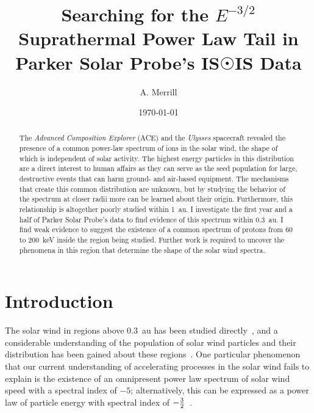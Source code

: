 \documentclass[letterpaper,11pt]{article}
\begin{document}
\title{Searching for the $E^{-3/2}$ Suprathermal Power Law Tail in Parker Solar Probe's IS$\Sun$IS Data}
\author{A. Merrill}
\date{\today}
\maketitle


\begin{abstract}
The  \textit{Advanced  Composition  Explorer} (ACE)  and  the  \textit{Ulysses}  spacecraft revealed the presence of a common power-law spectrum of ions in the solar wind, the shape of which is independent of solar activity.  The highest energy particles in this distribution are a direct interest to human affairs as they can serve as the seed population for large, destructive events that can harm ground- and air-based equipment.  The mechanisms that create this common distribution are unknown, but by studying the behavior of the spectrum  at  closer  radii  more  can  be  learned  about  their  origin.  Furthermore, this relationship is altogether poorly studied within \SI{1}{\astronomicalunit}.  I investigate the first year and a half of Parker Solar Probe's data to find evidence of this spectrum within \SI{0.3}{\astronomicalunit}. I find weak evidence to suggest the existence of a common spectrum of protons from 60 to \SI{200}{\kilo\electronvolt} inside the region being studied.  Further work is required to uncover the phenomena  in  this  region  that  determine  the  shape  of  the  solar  wind spectra.
\end{abstract}



\section{Introduction}
\label{sec:intro}
The solar wind in regions above \SI{0.3}{\astronomicalunit} has been studied directly~\citep{McComas2007}, and a considerable understanding of the population of solar wind particles and their distribution has been gained about these regions~\citep{Fisk2012,Fisk2006,Fisk2008,Gloeckler2000}.  One particular phenomenon that our current understanding of accelerating processes in the solar wind fails to explain is the existence of an omnipresent power law spectrum of solar wind speed with a spectral index of $-5$; alternatively, this can be expressed as a power law of particle energy with spectral index of $-{3 \over 2}$~\citep{Fisk2012}.
\end{document}
